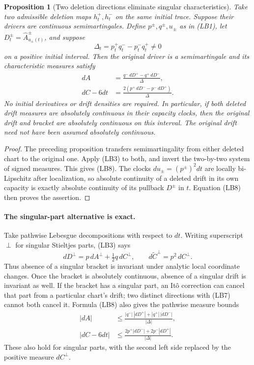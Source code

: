 \documentclass[11pt]{article}
\newtheorem{proposition}[theorem]{Proposition}
\theoremstyle{definition}\newtheorem{definition}[theorem]{Definition}
\theoremstyle{remark}\newtheorem{remark}[theorem]{Remark}
\begin{document}
\begin{proposition}[Two deletion directions eliminate singular characteristics]
\label{prop:two-deletion-measures}
Take two admissible deletion maps $h_t^+,h_t^-$ on the same initial
trace. Suppose their drivers are continuous semimartingales. Define
$p^\pm,q^\pm,u_\pm$ as in (LB1), let
$D^\pm_t=\widehat A^\pm_{u_\pm(t)}$, and suppose
\[
 \Delta_t=p_t^+q_t^- -p_t^-q_t^+\ne0
 \tag{LB7}
\]
on a positive initial interval. Then the original driver is a
semimartingale and its characteristic measures satisfy
\[
 \boxed{\begin{aligned}
 dA&=\frac{q^-\,dD^+-q^+\,dD^-}{\Delta},\\
 dC-6dt&=\frac{2(p^+\,dD^- -p^-\,dD^+)}{\Delta}.
 \end{aligned}}
 \tag{LB8}
\]
No initial derivatives or drift densities are required. In particular,
if both deleted drift measures are absolutely continuous in their
capacity clocks, then the original drift and bracket are absolutely
continuous on this interval. The original drift need not have been
assumed absolutely continuous.
\end{proposition}
\begin{proof}
The preceding proposition transfers semimartingality from either
deleted chart to the original one. Apply (LB3) to both, and invert the
two-by-two system of signed measures. This gives (LB8). The clocks
$du_\pm=(p^\pm)^2dt$ are locally bi-Lipschitz after localization, so
absolute continuity of a deleted drift in its own capacity is exactly
absolute continuity of its pullback $D^\pm$ in $t$. Equation (LB8)
then proves the assertion.
\end{proof}

\paragraph{The singular-part alternative is exact.}
Take pathwise Lebesgue decompositions with respect to $dt$. Writing
superscript $\perp$ for singular Stieltjes parts, (LB3) says
\[
 dD^\perp=p\,dA^\perp+\tfrac12q\,dC^\perp,
 \qquad d\widetilde C^\perp=p^2\,dC^\perp.
 \tag{LB9}
\]
Thus absence of a singular bracket is invariant under analytic local
coordinate changes. Once the bracket is absolutely continuous,
absence of a singular drift is invariant as well. If the bracket has
a singular part, an It\^o correction can cancel that part from a
particular chart's drift; two distinct directions with (LB7) cannot
both cancel it. Formula (LB8) also gives the pathwise measure bounds
\[
 \begin{aligned}
 |dA|&\le\frac{|q^-|\,|dD^+|+|q^+|\,|dD^-|}{|\Delta|},\\
 |dC-6dt|&\le\frac{2p^+|dD^-|+2p^-|dD^+|}{|\Delta|}.
 \end{aligned}
 \tag{LB10}
\]
These also hold for singular parts, with the second left side replaced
by the positive measure $dC^\perp$.
\end{document}
